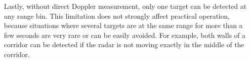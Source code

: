 Lastly, without direct Doppler measurement, only one target can be detected at any range bin. This limitation does not strongly affect practical operation, because situations where several targets are at the same range for more than a few seconds are very rare or can be easily avoided. For example, both walls of a corridor can be detected if the radar is not moving exactly in the middle of the corridor.

